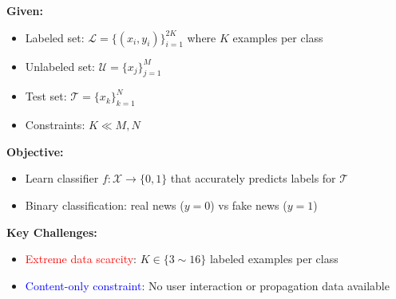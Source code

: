 \documentclass{article}
\begin{document}
\textbf{Given:}
\begin{itemize}
    \item Labeled set: $\mathcal{L} = \{(x_i, y_i)\}_{i=1}^{2K}$ where $K$ examples per class
    \item Unlabeled set: $\mathcal{U} = \{x_j\}_{j=1}^{M}$ 
    \item Test set: $\mathcal{T} = \{x_k\}_{k=1}^{N}$
    \item Constraints: $K \ll M, N$
\end{itemize}

\vspace{0.3cm}

\textbf{Objective:}
\begin{itemize}
    \item Learn classifier $f: \mathcal{X} \rightarrow \{0, 1\}$ that accurately predicts labels for $\mathcal{T}$
    \item Binary classification: real news ($y = 0$) vs fake news ($y = 1$)
\end{itemize}

\vspace{0.3cm}

\textbf{Key Challenges:}
\begin{itemize}
    \item \textcolor{red}{Extreme data scarcity}: $K \in \{3 \sim 16\}$ labeled examples per class
    \item \textcolor{blue}{Content-only constraint}: No user interaction or propagation data available
\end{itemize}
\end{document}
